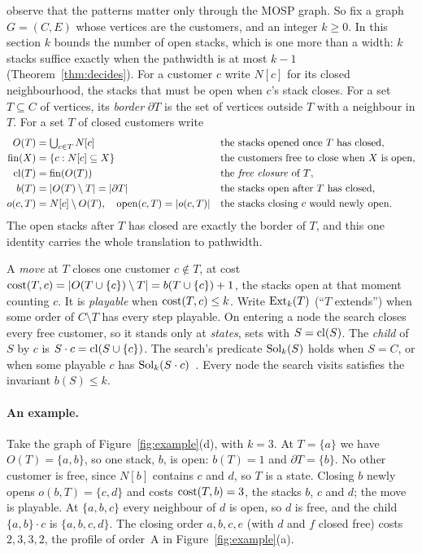 \citet[p.~4]{ChuStuckey2009} observe that the patterns matter only through the
MOSP graph. So fix a graph $G=(C,E)$ whose vertices are the customers, and an
integer $k\ge0$. In this section $k$ bounds the number of open stacks, which is
one more than a width: $k$ stacks suffice exactly when the pathwidth is at most
$k-1$ (Theorem~\ref{thm:decides}). For a customer $c$ write $N[c]$ for its
closed neighbourhood, the stacks that must be open when $c$'s stack closes. For
a set $T\subseteq C$ of vertices, its \emph{border} $\partial T$ is the set of
vertices outside $T$ with a neighbour in $T$. For a set $T$ of closed
customers write
\begin{align*}
O(T) &= \textstyle\bigcup_{c\in T}N[c] && \text{the stacks opened once $T$ has closed},\\
\mathrm{fin}(X) &= \{c : N[c]\subseteq X\} && \text{the customers free to close when $X$ is open},\\
\mathrm{cl}(T) &= \mathrm{fin}(O(T)) && \text{the \emph{free closure} of $T$},\\
b(T) &= |O(T)\setminus T| = |\partial T| && \text{the stacks open after $T$ has closed},\\
o(c,T) &= N[c]\setminus O(T),\quad \mathrm{open}(c,T)=|o(c,T)| && \text{the stacks closing $c$ would newly open.}
\end{align*}
The open stacks after $T$ has closed are exactly the border of $T$, and this
one identity carries the whole translation to pathwidth.

A \emph{move} at $T$ closes one customer $c\notin T$, at cost
$\mathrm{cost}(T,c)=|O(T\cup\{c\})\setminus T| = b(T\cup\{c\})+1$, the stacks open at
that moment counting $c$. It is \emph{playable} when $\mathrm{cost}(T,c)\le k$. Write
$\mathrm{Ext}_k(T)$ (``$T$ extends'') when some order of $C\setminus T$ has every step playable. On entering
a node the search closes every free customer, so it stands only at
\emph{states}, sets with $S=\mathrm{cl}(S)$. The \emph{child} of $S$ by $c$ is
$S\cdot c=\mathrm{cl}(S\cup\{c\})$. The search's predicate $\mathrm{Sol}_k(S)$ holds when
$S=C$, or when some playable $c$ has $\mathrm{Sol}_k(S\cdot c)$~. Every
node the search visits satisfies the invariant $b(S)\le k$.

\paragraph{An example.} Take the graph of Figure~\ref{fig:example}(d), with
$k=3$. At $T=\{a\}$ we have $O(T)=\{a,b\}$, so one stack, $b$, is open:
$b(T)=1$ and $\partial T=\{b\}$. No other customer is free, since $N[b]$
contains $c$ and $d$, so $T$ is a state. Closing $b$ newly opens
$o(b,T)=\{c,d\}$ and costs $\mathrm{cost}(T,b)=3$, the stacks $b$, $c$ and $d$; the
move is playable. At $\{a,b,c\}$ every neighbour of $d$ is open, so $d$ is
free, and the child $\{a,b\}\cdot c$ is $\{a,b,c,d\}$. The closing order
$a,b,c,e$ (with $d$ and $f$ closed free) costs $2,3,3,2$, the profile of
order~A in Figure~\ref{fig:example}(a).

